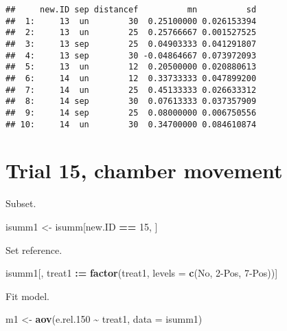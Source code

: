 \documentclass[
]{article}
\newenvironment{Shaded}{\begin{snugshade}}{\end{snugshade}}
\newcommand{\AttributeTok}[1]{\textcolor[rgb]{0.13,0.29,0.53}{#1}}
\newcommand{\DecValTok}[1]{\textcolor[rgb]{0.00,0.00,0.81}{#1}}
\newcommand{\FloatTok}[1]{\textcolor[rgb]{0.00,0.00,0.81}{#1}}
\newcommand{\FunctionTok}[1]{\textcolor[rgb]{0.13,0.29,0.53}{\textbf{#1}}}
\newcommand{\NormalTok}[1]{#1}
\newcommand{\OtherTok}[1]{\textcolor[rgb]{0.56,0.35,0.01}{#1}}
\newcommand{\SpecialCharTok}[1]{\textcolor[rgb]{0.81,0.36,0.00}{\textbf{#1}}}
\newcommand{\StringTok}[1]{\textcolor[rgb]{0.31,0.60,0.02}{#1}}
\begin{document}
\begin{verbatim}
##     new.ID sep distancef          mn          sd
##  1:     13  un        30  0.25100000 0.026153394
##  2:     13  un        25  0.25766667 0.001527525
##  3:     13 sep        25  0.04903333 0.041291807
##  4:     13 sep        30 -0.04864667 0.073972093
##  5:     13  un        12  0.20500000 0.020880613
##  6:     14  un        12  0.33733333 0.047899200
##  7:     14  un        25  0.45133333 0.026633312
##  8:     14 sep        30  0.07613333 0.037357909
##  9:     14 sep        25  0.08000000 0.006750556
## 10:     14  un        30  0.34700000 0.084610874
\end{verbatim}

\section{Trial 15, chamber movement}\label{trial-15-chamber-movement}

Subset.

\begin{Shaded}
\begin{Highlighting}[]
\NormalTok{isumm1 }\OtherTok{\textless{}{-}}\NormalTok{ isumm[new.ID }\SpecialCharTok{==} \DecValTok{15}\NormalTok{, ]}
\end{Highlighting}
\end{Shaded}

Set reference.

\begin{Shaded}
\begin{Highlighting}[]
\NormalTok{isumm1[, treat1 }\SpecialCharTok{:=} \FunctionTok{factor}\NormalTok{(treat1, }\AttributeTok{levels =} \FunctionTok{c}\NormalTok{(}\StringTok{\textquotesingle{}No\textquotesingle{}}\NormalTok{, }\StringTok{\textquotesingle{}2{-}Pos\textquotesingle{}}\NormalTok{, }\StringTok{\textquotesingle{}7{-}Pos\textquotesingle{}}\NormalTok{))]}
\end{Highlighting}
\end{Shaded}

Fit model.

\begin{Shaded}
\begin{Highlighting}[]
\NormalTok{m1 }\OtherTok{\textless{}{-}} \FunctionTok{aov}\NormalTok{(e.rel}\FloatTok{.150} \SpecialCharTok{\textasciitilde{}}\NormalTok{ treat1, }\AttributeTok{data =}\NormalTok{ isumm1)}
\end{Highlighting}
\end{Shaded}
\end{document}
